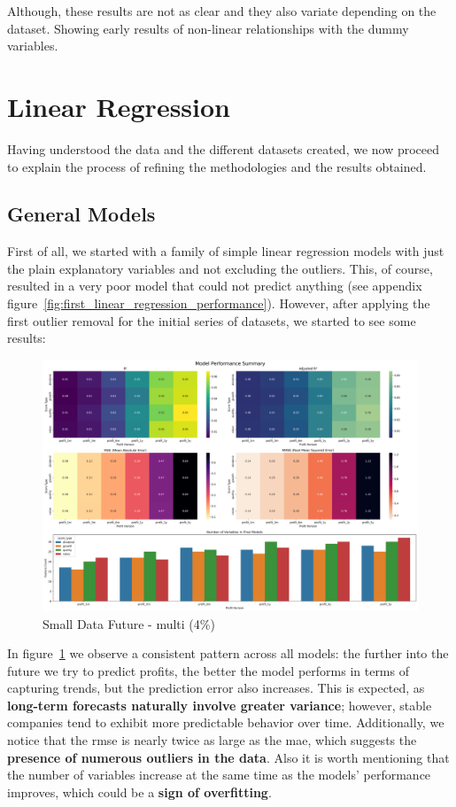 \documentclass[11pt,english,a4paper,hidelinks]{book}
\begin{document}
\noindent Although, these results are not as clear and they also variate depending on the dataset. Showing early results of non-linear relationships with the dummy variables.

\section{Linear Regression}

Having understood the data and the different datasets created, we now proceed to explain the process of refining the methodologies and the results obtained.
\subsection{General Models}

First of all, we started with a family of simple linear regression models with just the plain explanatory variables and not excluding the outliers. This, of course, resulted in a very poor model that could not predict anything (see appendix figure~\ref{fig:first_linear_regression_performance}). However, after applying the first outlier removal for the initial series of datasets, we started to see some results:

\begin{figure}[H]
    \centering
    \includegraphics[width=1\textwidth]{images/code/models/linear_regression/first_model/Small Data future - Multi performance.png}
    \caption{Small Data Future - \acrshort{multi} (4\%)}
    \label{fig:first_linear_regression}
\end{figure}

\noindent In figure~\ref{fig:first_linear_regression} we observe a consistent pattern across all models: the further into the future we try to predict profits, the better the model performs in terms of capturing trends, but the prediction error also increases. This is expected, as \textbf{long-term forecasts naturally involve greater variance}; however, stable companies tend to exhibit more predictable behavior over time. Additionally, we notice that the \acrshort{rmse} is nearly twice as large as the \acrshort{mae}, which suggests the \textbf{presence of numerous outliers in the data}. Also it is worth mentioning that the number of variables increase at the same time as the models' performance improves, which could be a \textbf{sign of overfitting}.
\end{document}
